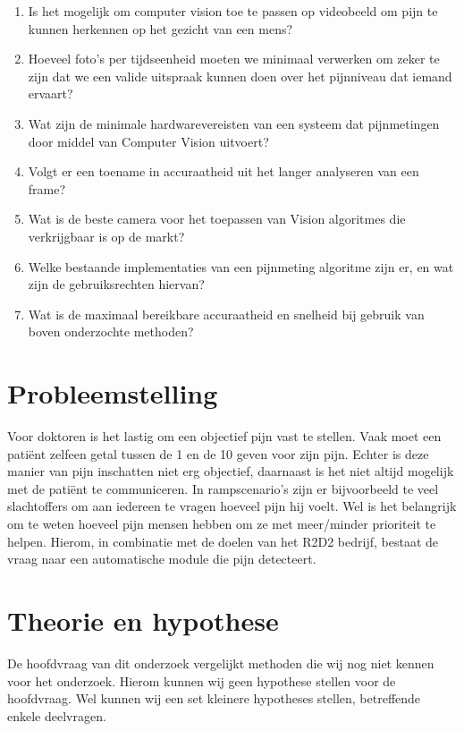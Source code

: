 \documentclass[11pt]{article}
\begin{document}
    \begin{enumerate}
        \item\label{itm:dv1} Is het mogelijk om computer vision toe te passen op videobeeld om pijn te kunnen herkennen op het gezicht van een mens?
        \item\label{itm:dv2} Hoeveel foto's per tijdseenheid moeten we minimaal verwerken om zeker te zijn dat we een valide uitspraak kunnen doen over het pijnniveau dat iemand ervaart?
        \item\label{itm:dv3} Wat zijn de minimale hardwarevereisten van een systeem dat pijnmetingen door middel van Computer Vision uitvoert?
        \item\label{itm:dv4} Volgt er een toename in accuraatheid uit het langer analyseren van een frame?
        \item\label{itm:dv5} Wat is de beste camera voor het toepassen van Vision algoritmes die verkrijgbaar is op de markt?
        \item\label{itm:dv6} Welke bestaande implementaties van een pijnmeting algoritme zijn er, en wat zijn de gebruiksrechten hiervan?
        \item\label{itm:dv7} Wat is de maximaal bereikbare accuraatheid en snelheid bij gebruik van boven onderzochte methoden?
    \end{enumerate}


    \section{Probleemstelling}\label{sec:probleemstelling}
    Voor doktoren is het lastig om een objectief pijn vast te stellen.
    Vaak moet een pati\"{e}nt zelfeen getal tussen de 1 en de 10 geven voor zijn pijn.
    Echter is deze manier van pijn inschatten niet erg objectief, daarnaast is het niet
    altijd mogelijk met de pati\"{e}nt te communiceren.
    In rampscenario's zijn er bijvoorbeeld te veel slachtoffers om aan iedereen te vragen hoeveel pijn hij voelt.
    Wel is het belangrijk om te weten hoeveel pijn mensen hebben om ze met meer/minder prioriteit te helpen.
    Hierom, in combinatie met de doelen van het R2D2 bedrijf, bestaat de vraag naar een automatische module die pijn
    detecteert.


    \section{Theorie en hypothese}\label{sec:theorie-en-hypothese}
    De hoofdvraag van dit onderzoek vergelijkt methoden die wij nog niet kennen voor het onderzoek.
    Hierom kunnen wij geen hypothese stellen voor de hoofdvraag.
    Wel kunnen wij een set kleinere hypotheses stellen, betreffende enkele deelvragen.
\end{document}
